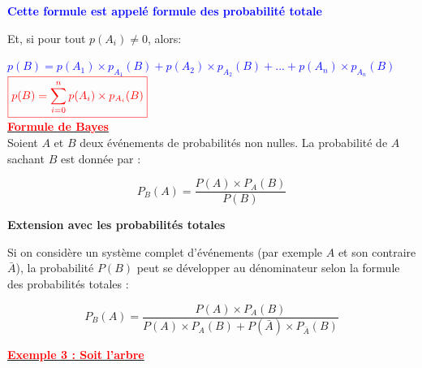 \documentclass[12pt,a4paper]{article}
\newcounter{exemple}
\begin{document}
\textbf{\textcolor{blue}{Cette formule est appelé formule des probabilité totale}}

Et, si pour tout $p(A_{i}) \neq 0$, alors:

\textcolor{blue}{$p(B)=p(A_{1})\times p_{A_{1}}(B)+p(A_{2})\times p_{A_{2}}(B)+...+p(A_{n})\times p_{A_{n}}(B)$}\\

$\color{red}\boxed{p(B)=\sum_{i=0}^{n}p(A_{i})\times p_{A_{i}}(B)}$\\

\underline{\textbf{\textcolor{red}{ Formule de Bayes}}}\\

Soient $A$ et $B$ deux événements de probabilités non nulles. La probabilité de $A$ sachant $B$ est donnée par :

\begin{equation*}
    \boxed{P_B(A) = \frac{P(A) \times P_A(B)}{P(B)}}
\end{equation*}

\textbf{Extension avec les probabilités totales}

Si on considère un système complet d'événements (par exemple $A$ et son contraire $\bar{A}$), la probabilité $P(B)$ peut se développer au dénominateur selon la formule des probabilités totales :

\begin{equation*}
    P_B(A) = \frac{P(A) \times P_A(B)}{P(A) \times P_A(B) + P(\bar{A}) \times P_{\bar{A}}(B)}
\end{equation*}

\underline{\textbf{\textcolor{red}{ Exemple 3 : Soit l'arbre }}}\\

\begin{center}
\end{center}
\end{document}
